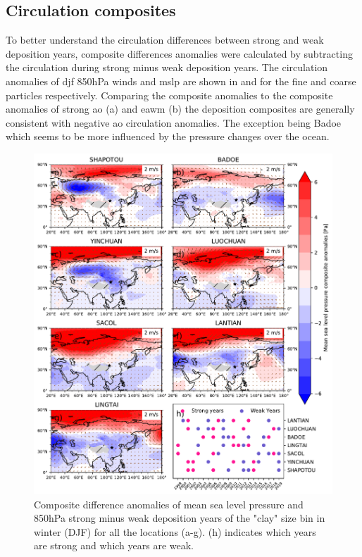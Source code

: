 \subsection{Circulation composites}

To better understand the circulation differences between strong and weak deposition years, composite differences anomalies were calculated by subtracting the circulation during strong minus weak deposition years. 
The circulation anomalies of \acrshort{djf} 850hPa winds and \acrshort{mslp} are shown in  and  for the fine and coarse particles respectively.
Comparing the composite anomalies to the composite anomalies of strong \acrshort{ao} (a) and \acrshort{eawm} (b) the deposition composites are generally consistent with negative \acrshort{ao} circulation anomalies.
The exception being Badoe which seems to be more influenced by the pressure changes over the ocean. 




\begin{figure}[hp]
    \centering
    \includegraphics[width=\columnwidth]{texfiles/figs/mslp_850hPa_2micron_DJF.pdf}
    \caption{Composite difference anomalies of mean sea level pressure and 850hPa strong minus weak deposition years of the "clay" size bin in winter (DJF) for all the locations (a-g). (h) indicates which years are strong and which years are weak.}
    \label{fig:DJF_850_fine_composite}
\end{figure}


